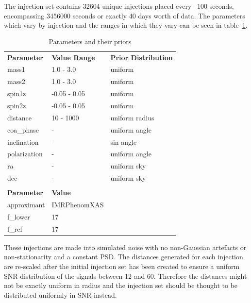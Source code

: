 The injection set contains 32604 unique injections placed every ~100 seconds, encompassing 3456000 seconds or exactly 40 days worth of data. The parameters which vary by injection and the ranges in which they vary can be seen in table~\ref{tab:ew_inj_params}.
%
\begin{table}
    \centering
    \begin{tabular}{|>{\raggedright}p{3cm}|>{\raggedright}p{5cm}|>{\raggedright\arraybackslash}p{5cm}|}
        \hline
        \multicolumn{3}{|c|}{\textbf{Variable Parameters}} \\
        \hline
        \textbf{Parameter} & \textbf{Value Range} & \textbf{Prior Distribution} \\ \hline
        mass1 & 1.0 - 3.0 & uniform \\ \hline
        mass2 & 1.0 - 3.0 & uniform \\ \hline
        spin1z & -0.05 - 0.05 & uniform \\ \hline
        spin2z & -0.05 - 0.05 & uniform \\ \hline
        distance & 10 - 1000 & uniform radius \\ \hline
        coa\_phase & - & uniform angle \\ \hline
        inclination & - & sin angle \\ \hline
        polarization & - & uniform angle \\ \hline
        ra & - & uniform sky \\ \hline
        dec & - & uniform sky \\ \hline
        \hline
        \multicolumn{3}{|c|}{\textbf{Static Parameters}} \\
        \hline
        \textbf{Parameter} & \textbf{Value} & \textbf{} \\ \hline
        approximant & IMRPhenomXAS & \\ \hline
        f\_lower & 17 & \\ \hline
        f\_ref & 17 & \\ \hline
    \end{tabular}
    \caption{Parameters and their priors}
    \label{tab:ew_inj_params}
\end{table}
%
These injections are made into simulated noise with no non-Gaussian artefacts or non-stationarity and a constant PSD. The distances generated for each injection are re-scaled after the initial injection set has been created to ensure a uniform SNR distribution of the signals between 12 and 60. Therefore the distances might not be exactly uniform in radius and the injection set should be thought to be distributed uniformly in SNR instead.

